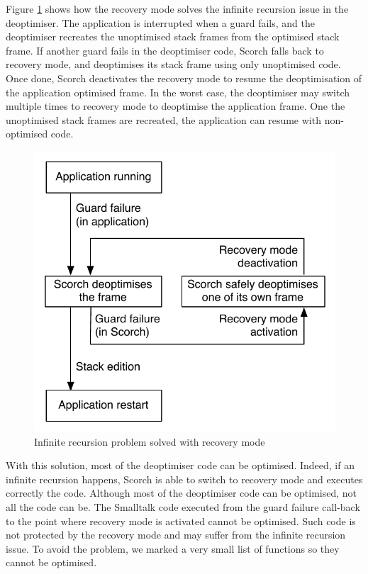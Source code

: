 \documentclass[a4paper,12pt,twoside]{../includes/ThesisStyle}
\begin{document}
Figure \ref{fig:InfiniteRecursionDeoptPbRecovery} shows how the recovery mode solves the infinite recursion issue in the deoptimiser. The application is interrupted when a guard fails, and the deoptimiser recreates the unoptimised stack frames from the optimised stack frame. If another guard fails in the deoptimiser code, Scorch falls back to recovery mode, and deoptimises its stack frame using only unoptimised code. Once done, Scorch deactivates the recovery mode to resume the deoptimisation of the application optimised frame. In the worst case, the deoptimiser may switch multiple times to recovery mode to deoptimise the application frame. One the unoptimised stack frames are recreated, the application can resume with non-optimised code.

\begin{figure}[h!]
    \begin{center}
        \includegraphics[width=0.6\linewidth]{InfiniteRecursionDeoptPbRecovery}
        \caption{Infinite recursion problem solved with recovery mode}
        \label{fig:InfiniteRecursionDeoptPbRecovery}
    \end{center}
\end{figure}

With this solution, most of the deoptimiser code can be optimised. Indeed, if an infinite recursion happens, Scorch is able to switch to recovery mode and executes correctly the code. Although most of the deoptimiser code can be optimised, not all the code can be. The Smalltalk code executed from the guard failure call-back to the point where recovery mode is activated cannot be optimised. Such code is not protected by the recovery mode and may suffer from the infinite recursion issue. To avoid the problem, we marked a very small list of functions so they cannot be optimised.
\end{document}
